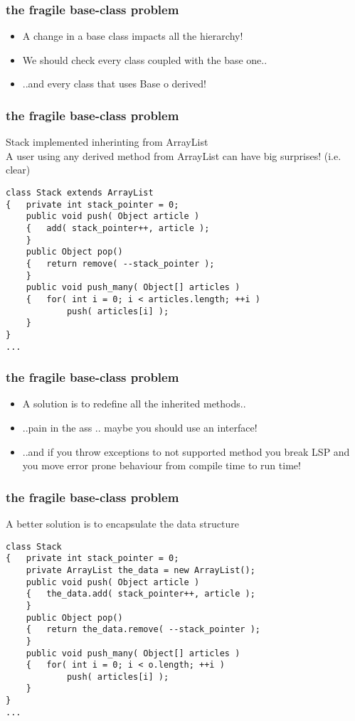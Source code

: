 \documentclass{beamer}
\begin{document}
\begin{frame}
  \frametitle{the fragile base-class problem}
  \begin{itemize}
  \item<+-> A change in a base class impacts all the hierarchy! 
  \item<+-> We should check every class coupled with the base one..
  \item<+-> ..and every class that uses Base o derived!
  \end{itemize}
\end{frame}


\begin{frame}[containsverbatim]
	\frametitle{the fragile base-class problem}
	Stack implemented inherinting from ArrayList   \\
	A user using any derived method from ArrayList can have big surprises! (i.e. clear)\\
	\begin{lstlisting}
class Stack extends ArrayList
{   private int stack_pointer = 0;
    public void push( Object article )
    {   add( stack_pointer++, article );
    }
    public Object pop()
    {   return remove( --stack_pointer );
    }
    public void push_many( Object[] articles )
    {   for( int i = 0; i < articles.length; ++i )
            push( articles[i] );
    }
}
...
\end{lstlisting}
\end{frame}

\begin{frame}
  \frametitle{the fragile base-class problem}
  \begin{itemize}
  \item<+-> A solution is to redefine all the inherited methods..
  \item<+-> ..pain in the ass .. maybe you should use an interface!
  \item<+-> ..and if you throw exceptions to not supported method you break LSP and you move error prone behaviour
  from compile time to run time! 
  \end{itemize}
\end{frame}

\begin{frame}[containsverbatim]
	\frametitle{the fragile base-class problem}
	A better solution is to encapsulate the data structure   \\
	\begin{lstlisting}
class Stack
{   private int stack_pointer = 0;
    private ArrayList the_data = new ArrayList();
    public void push( Object article )
    {   the_data.add( stack_pointer++, article );
    }
    public Object pop()
    {   return the_data.remove( --stack_pointer );
    }
    public void push_many( Object[] articles )
    {   for( int i = 0; i < o.length; ++i )
            push( articles[i] );
    }
}
...
\end{lstlisting}
\end{frame}
\end{document}
